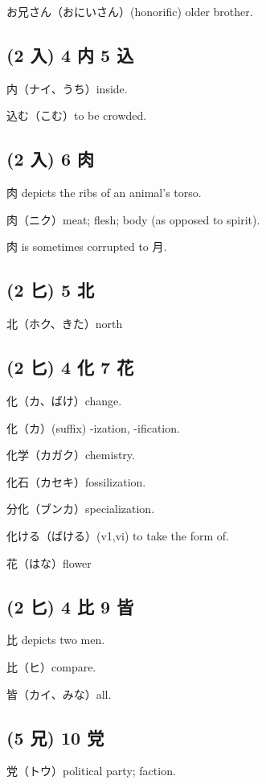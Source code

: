 お兄さん（おにいさん）(honorific) older brother.

\subsection{(2 入) 4 内 5 込}

内（ナイ、うち）inside.

込む（こむ）to be crowded.

\subsection{(2 入) 6 肉}

肉 depicts the ribs of an animal's torso.

肉（ニク）meat; flesh; body (as opposed to spirit).

肉 is sometimes corrupted to 月.

\subsection{(2 匕) 5 北}

北（ホク、きた）north

\subsection{(2 匕) 4 化 7 花}

化（カ、ばけ）change.

化（カ）(suffix) -ization, -ification.

化学（カガク）chemistry.

化石（カセキ）fossilization.

分化（ブンカ）specialization.

化ける（ばける）(v1,vi) to take the form of.

花（はな）flower

\subsection{(2 匕) 4 比 9 皆}

比 depicts two men.

比（ヒ）compare.

皆（カイ、みな）all.

\subsection{(5 兄) 10 党}

党（トウ）political party; faction.

